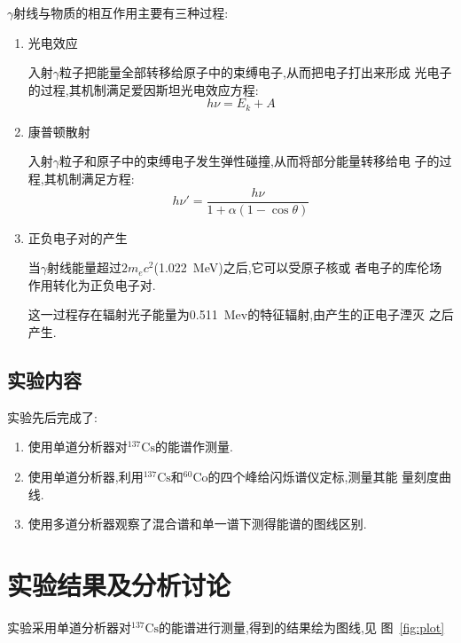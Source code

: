 \documentclass[aps,pre,12pt,preprint,onecolumn,showpacs,showkeys]{revtex4-1}
\begin{document}
$\gamma$射线与物质的相互作用主要有三种过程:\cite{book}

\begin{enumerate}
\item 光电效应

入射$\gamma$粒子把能量全部转移给原子中的束缚电子,从而把电子打出来形成
光电子的过程,其机制满足爱因斯坦光电效应方程:
\begin{equation}
  h\nu = E_k + A
\end{equation}

\item 康普顿散射

入射$\gamma$粒子和原子中的束缚电子发生弹性碰撞,从而将部分能量转移给电
子的过程,其机制满足方程:
\begin{equation}
  h\nu' = \frac{h\nu}{1+\alpha(1-\cos{\theta})}
\end{equation}

\item 正负电子对的产生

当$\gamma$射线能量超过$2m_ec^2$(\SI{1.022}{MeV})之后,它可以受原子核或
者电子的库伦场作用转化为正负电子对.

这一过程存在辐射光子能量为\SI{0.511}{Mev}的特征辐射,由产生的正电子湮灭
之后产生.
\end{enumerate}

\subsection{实验内容}

实验先后完成了:

\begin{enumerate}
\item 使用单道分析器对$^{137}\text{Cs}$的能谱作测量.
\item 使用单道分析器,利用$^{137}\text{Cs}$和$^{60}\text{Co}$的四个峰给闪烁谱仪定标,测量其能
  量刻度曲线.
\item 使用多道分析器观察了混合谱和单一谱下测得能谱的图线区别.
\end{enumerate}


\section{实验结果及分析讨论}
 
实验采用单道分析器对$^{137}\text{Cs}$的能谱进行测量,得到的结果绘为图线,见
图~\ref{fig:plot}
\end{document}
